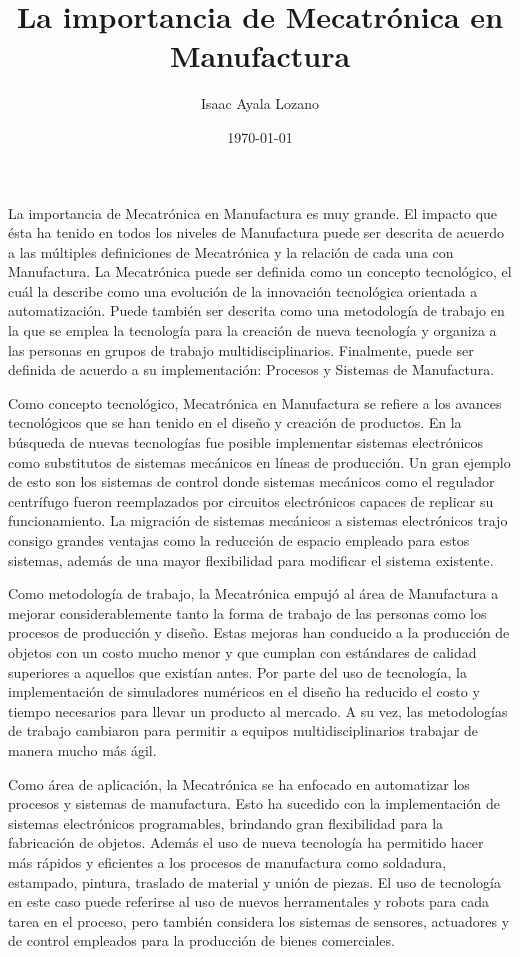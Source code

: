 \documentclass[a4paper,12pt]{article}
\title{La importancia de Mecatrónica en Manufactura}
\author{Isaac Ayala Lozano}
\date{\today}
\begin{document}
\maketitle

La importancia de Mecatrónica en Manufactura es muy grande.
El impacto que ésta ha tenido en todos los niveles de Manufactura puede ser descrita de acuerdo a las múltiples definiciones de Mecatrónica y la relación de cada una con Manufactura.
La Mecatrónica puede ser definida como un concepto tecnológico, el cuál la describe como una evolución de la innovación tecnológica orientada a automatización.
Puede también ser descrita como una metodología de trabajo en la que se emplea la tecnología para la creación de nueva tecnología y organiza a las personas en grupos de trabajo multidisciplinarios.
Finalmente, puede ser definida de acuerdo a su implementación: Procesos y Sistemas de Manufactura.

Como concepto tecnológico, Mecatrónica en Manufactura se refiere a los avances tecnológicos que se han tenido en el diseño y creación de productos.
En la búsqueda de nuevas tecnologías fue posible implementar sistemas electrónicos como substitutos de sistemas mecánicos en líneas de producción.
Un gran ejemplo de esto son los sistemas de control donde sistemas mecánicos como el regulador centrífugo fueron reemplazados por circuitos electrónicos capaces de replicar su funcionamiento.
La migración de sistemas mecánicos a sistemas electrónicos trajo consigo grandes ventajas como la reducción de espacio empleado para estos sistemas, además de una mayor flexibilidad para modificar el sistema existente.

Como metodología de trabajo, la Mecatrónica empujó al área de Manufactura a mejorar considerablemente tanto la forma de trabajo de las personas como los procesos de producción y diseño.
Estas mejoras han conducido a la producción de objetos con un costo mucho menor y que cumplan con estándares de calidad superiores a aquellos que existían antes.
Por parte del uso de tecnología, la implementación de simuladores numéricos en el diseño ha reducido el costo y tiempo necesarios para llevar un producto al mercado.
A su vez, las metodologías de trabajo cambiaron para permitir a equipos multidisciplinarios trabajar de manera mucho más ágil.

Como área de aplicación, la Mecatrónica se ha enfocado en automatizar los procesos y sistemas de manufactura.
Esto ha sucedido con la implementación de sistemas electrónicos programables, brindando gran flexibilidad para la fabricación de objetos.
Además el uso de nueva tecnología ha permitido hacer más rápidos y eficientes a los procesos de manufactura como soldadura, estampado, pintura, traslado de material y unión de piezas.
El uso de tecnología en este caso puede referirse al uso de nuevos herramentales y robots para cada tarea en el proceso, pero también considera los sistemas de sensores, actuadores y de control empleados para la producción de bienes comerciales.
\end{document}
